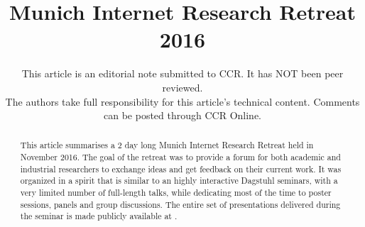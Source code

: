 \documentclass{sig-alternate}
\begin{document}
\title{Munich Internet Research Retreat 2016}

\author{
\begin{tabular}{c}
{\normalsize This article is an editorial note submitted to CCR. It has NOT
been peer reviewed.}\\
{\normalsize The authors take full responsibility for this article's
technical content. Comments can be posted through CCR Online.}
\end{tabular}
}

\maketitle

\begin{abstract}

This article summarises a 2 day long Munich Internet Research Retreat held in
November 2016.  The goal of the retreat was to provide a forum for both
academic and industrial researchers to exchange ideas and get feedback on
their current work. It was organized in a spirit that is similar to an highly
interactive Dagstuhl seminars, with a very limited number of full-length
talks, while dedicating most of the time to poster sessions, panels and group
discussions. The entire set of presentations delivered during the seminar is
made publicly available at \cite{mir-materials}.

\end{abstract}
\end{document}
